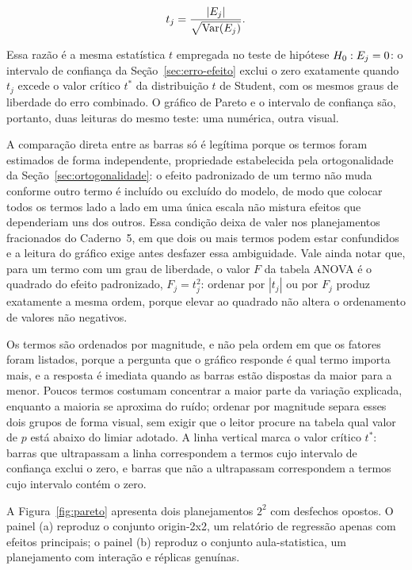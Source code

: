 \documentclass{doeapostila}
\begin{document}
\begin{equation}
  t_{j} = \frac{|E_{j}|}{\sqrt{\mathrm{Var}(E_{j})}} .
  \label{eq:padronizado}
\end{equation}

Essa razão é a mesma estatística $t$ empregada no teste de hipótese
$H_{0}: E_{j} = 0$: o intervalo de confiança da
Seção~\ref{sec:erro-efeito} exclui o zero exatamente quando $t_{j}$ excede o
valor crítico $t^{*}$ da distribuição $t$ de Student, com os mesmos graus de
liberdade do erro combinado. O gráfico de Pareto e o intervalo de confiança
são, portanto, duas leituras do mesmo teste: uma numérica, outra visual.

A comparação direta entre as barras só é legítima porque os termos foram
estimados de forma independente, propriedade estabelecida pela
ortogonalidade da Seção~\ref{sec:ortogonalidade}: o efeito padronizado de um
termo não muda conforme outro termo é incluído ou excluído do modelo, de
modo que colocar todos os termos lado a lado em uma única escala não mistura
efeitos que dependeriam uns dos outros. Essa condição deixa de valer nos
planejamentos fracionados do Caderno~5, em que dois ou mais termos podem
estar confundidos e a leitura do gráfico exige antes desfazer essa
ambiguidade. Vale ainda notar que, para um termo com um grau de liberdade, o
valor $F$ da tabela ANOVA é o quadrado do efeito padronizado,
$F_{j} = t_{j}^{2}$: ordenar por $|t_{j}|$ ou por $F_{j}$ produz exatamente
a mesma ordem, porque elevar ao quadrado não altera o ordenamento de valores
não negativos.

Os termos são ordenados por magnitude, e não pela ordem em que os fatores
foram listados, porque a pergunta que o gráfico responde é qual termo importa
mais, e a resposta é imediata quando as barras estão dispostas da maior para
a menor. Poucos termos costumam concentrar a maior parte da variação
explicada, enquanto a maioria se aproxima do ruído; ordenar por magnitude
separa esses dois grupos de forma visual, sem exigir que o leitor procure na
tabela qual valor de $p$ está abaixo do limiar adotado. A linha vertical
marca o valor crítico $t^{*}$: barras que ultrapassam a linha correspondem a
termos cujo intervalo de confiança exclui o zero, e barras que não a
ultrapassam correspondem a termos cujo intervalo contém o zero.

A Figura~\ref{fig:pareto} apresenta dois planejamentos $2^{2}$ com desfechos
opostos. O painel (a) reproduz o conjunto origin-2x2, um relatório de
regressão apenas com efeitos principais; o painel (b) reproduz o conjunto
aula-statistica, um planejamento com interação e réplicas genuínas.
\end{document}
